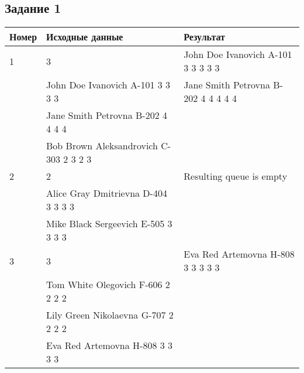 \subsection*{\centering Задание 1}
\begin{table}[H]
    \centering
    \begin{tabular}{|l|l|l|}
        \hline
        Номер & Исходные данные & Результат\\[2ex] \hline
        1     & 3 & John Doe Ivanovich A-101 3 3 3 3 3\\
              & John Doe Ivanovich A-101 3 3 3 3 & Jane Smith Petrovna B-202 4 4 4 4 4\\
              & Jane Smith Petrovna B-202 4 4 4 4 &\\
              & Bob Brown Aleksandrovich C-303 2 3 2 3 &\\[2ex]\hline
        2     & 2 & Resulting queue is empty\\
              & Alice Gray Dmitrievna D-404 3 3 3 3&\\
              & Mike Black Sergeevich E-505 3 3 3 3&\\[2ex]\hline
        3     & 3 & Eva Red Artemovna H-808 3 3 3 3 3\\
              & Tom White Olegovich F-606 2 2 2 2 &\\
              & Lily Green Nikolaevna G-707 2 2 2 2 &\\
              & Eva Red Artemovna H-808 3 3 3 3 &\\[2ex]\hline
    \end{tabular}
\end{table}
\pagebreak

